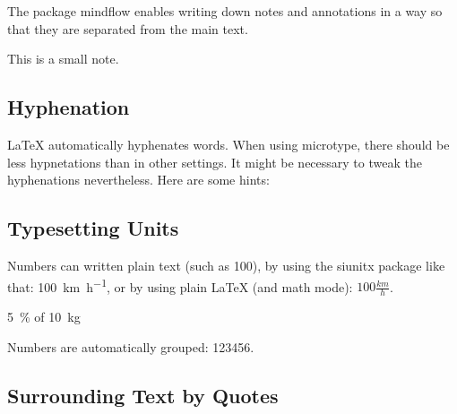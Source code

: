 \documentclass[runningheads,a4paper,english]{llncs}[2022/01/12]
\begin{document}
The package mindflow enables writing down notes and annotations in a way so that they are separated from the main text.

\begin{ltgexample}
\begin{mindflow}
This is a small note.
\end{mindflow}
\end{ltgexample}

\subsection{Hyphenation}

\LaTeX{} automatically hyphenates words.
When using microtype, there should be less hypnetations than in other settings.
It might be necessary to tweak the hyphenations nevertheless.
Here are some hints:


\subsection{Typesetting Units}

\begin{ltgexample}
Numbers can written plain text (such as 100), by using the siunitx package like that:
\SI{100}{\km\per\hour},
or by using plain \LaTeX{} (and math mode):
$100 \frac{\mathit{km}}{h}$.
\end{ltgexample}

\begin{ltgexample}
\SI{5}{\percent} of \SI{10}{kg}
\end{ltgexample}

\begin{ltgexample}
Numbers are automatically grouped: \num{123456}.
\end{ltgexample}

\subsection{Surrounding Text by Quotes}
\end{document}
